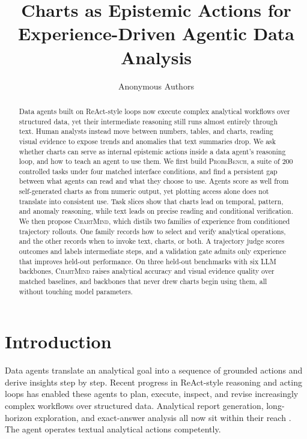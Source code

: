 \documentclass{article}
\title{Charts as Epistemic Actions for Experience-Driven Agentic Data Analysis}
\author{Anonymous Authors}
\newcommand{\method}{\textsc{ChartMind}\xspace}
\newcommand{\probe}{\textsc{ProbeBench}\xspace}
\begin{document}
\maketitle

\begin{abstract}
Data agents built on ReAct-style loops now execute complex analytical workflows over structured data, yet their intermediate reasoning still runs almost entirely through text. Human analysts instead move between numbers, tables, and charts, reading visual evidence to expose trends and anomalies that text summaries drop. We ask whether charts can serve as internal epistemic actions inside a data agent's reasoning loop, and how to teach an agent to use them. We first build \probe{}, a suite of 200 controlled tasks under four matched interface conditions, and find a persistent gap between what agents can read and what they choose to use. Agents score as well from self-generated charts as from numeric output, yet plotting access alone does not translate into consistent use. Task slices show that charts lead on temporal, pattern, and anomaly reasoning, while text leads on precise reading and conditional verification. We then propose \method{}, which distils two families of experience from conditioned trajectory rollouts. One family records how to select and verify analytical operations, and the other records when to invoke text, charts, or both. A trajectory judge scores outcomes and labels intermediate steps, and a validation gate admits only experience that improves held-out performance. On three held-out benchmarks with six LLM backbones, \method{} raises analytical accuracy and visual evidence quality over matched baselines, and backbones that never drew charts begin using them, all without touching model parameters.
\end{abstract}

\section{Introduction}
\label{sec:introduction}

\noindent Data agents translate an analytical goal into a sequence of grounded actions and derive insights step by step. Recent progress in ReAct-style reasoning and acting loops \citep{yao2023react} has enabled these agents to plan, execute, inspect, and revise increasingly complex workflows over structured data. Analytical report generation, long-horizon exploration, and exact-answer analysis all now sit within their reach \citep{lei2025dacomp,liu2026ddrbench,jing2024dsbench}. The agent operates textual analytical actions competently.
\end{document}
